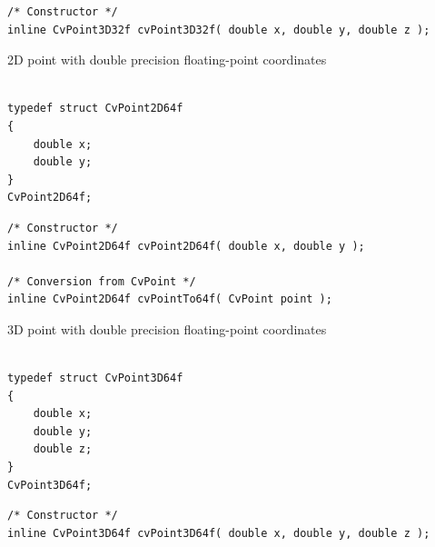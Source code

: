 \begin{description}
\end{description}

\begin{lstlisting}
/* Constructor */
inline CvPoint3D32f cvPoint3D32f( double x, double y, double z );

\end{lstlisting}

\label{CvPoint2D64f}

2D point with double precision floating-point coordinates

\begin{lstlisting}

typedef struct CvPoint2D64f
{
    double x; 
    double y; 
}
CvPoint2D64f;
\end{lstlisting}

\begin{description}
\end{description}

\begin{lstlisting}
/* Constructor */
inline CvPoint2D64f cvPoint2D64f( double x, double y );

/* Conversion from CvPoint */
inline CvPoint2D64f cvPointTo64f( CvPoint point );

\end{lstlisting}

\label{CvPoint3D64f}

3D point with double precision floating-point coordinates

\begin{lstlisting}

typedef struct CvPoint3D64f
{
    double x; 
    double y; 
    double z; 
}
CvPoint3D64f;
\end{lstlisting}

\begin{description}
\end{description}

\begin{lstlisting}
/* Constructor */
inline CvPoint3D64f cvPoint3D64f( double x, double y, double z );

\end{lstlisting}

\label{CvSize}

